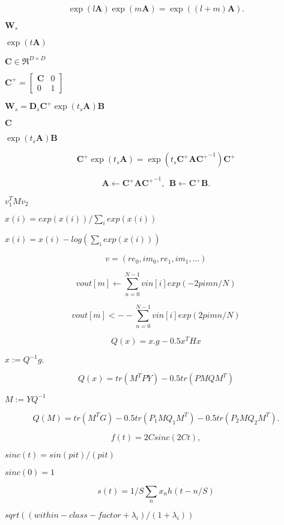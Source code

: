\documentclass{article}
\begin{document}
\[ \exp( l \mathbf{A} ) \exp( m \mathbf{A}) = \exp( (l+m) \mathbf{A} ) . \]
\pagebreak

$\mathbf{W}_s$
\pagebreak

$\exp(t \mathbf{A})$
\pagebreak

$\mathbf{C} \in \Re^{D\times D}$
\pagebreak

$\mathbf{C}^+ = \left[ \begin{array}{cc} \mathbf{C} & 0 \\ 0 & 1 \end{array} \right]$
\pagebreak

$\mathbf{W}_s = \mathbf{D}_s \mathbf{C}^+ \exp ( t_s \mathbf{A} ) \mathbf{B}$
\pagebreak

$\mathbf{C}$
\pagebreak

$\exp ( t_s \mathbf{A} ) \mathbf{B}$
\pagebreak

\[ \mathbf{C}^+ \exp ( t_s \mathbf{A} ) = \exp ( t_s \mathbf{C}^+ \mathbf{A} \left.\mathbf{C}^+\right.^{-1} ) \mathbf{C}^+ \]
\pagebreak

\[ \mathbf{A} \leftarrow \mathbf{C}^+ \mathbf{A} \left.\mathbf{C}^+\right.^{-1} , \ \ \mathbf{B} \leftarrow \mathbf{C}^+ \mathbf{B} . \]
\pagebreak

$ v_1^T M v_2 $
\pagebreak

$ x(i) = exp(x(i)) / \sum_i exp(x(i)) $
\pagebreak

$ x(i) = x(i) - log(\sum_i exp(x(i))) $
\pagebreak

\[ v = ( re_0, im_0, re_1, im_1, ... ) \]
\pagebreak

\[ vout[m] \leftarrow \sum_{n = 0}^{N-1} vin[i] exp( -2pi m n / N ) \]
\pagebreak

\[ vout[m] <-- \sum_{n = 0}^{N-1} vin[i] exp( 2pi m n / N ) \]
\pagebreak

\[ Q(x) = x.g - 0.5 x^T H x \]
\pagebreak

$ x := Q^{-1} g. $
\pagebreak

\[ Q(x) = tr(M^T P Y) - 0.5 tr(P M Q M^T) \]
\pagebreak

$ M := Y Q^{-1} $
\pagebreak

\[ Q(M) = tr(M^T G) -0.5 tr(P_1 M Q_1 M^T) -0.5 tr(P_2 M Q_2 M^T). \]
\pagebreak

\[ f(t) = 2C sinc(2Ct), \]
\pagebreak

$ sinc(t) = sin(pi t) / (pi t) $
\pagebreak

$ sinc(0) = 1 $
\pagebreak

\[ s(t) = 1/S \sum_n x_n h(t - n/S) \]
\pagebreak

$ sqrt( (within-class-factor + \lambda_i) / (1 + \lambda_i) ) $
\pagebreak
\end{document}
